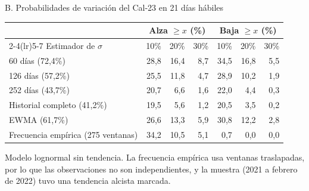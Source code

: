 \documentclass[aspectratio=169,11pt]{beamer}
\newcommand{\fuente}[1]{\vfill{\raggedright\tiny\color{cezgray}Fuente: #1\par}}
\begin{document}
\begin{frame}[t]{B. Probabilidades de variación del Cal-23 en 21 días hábiles}
  \centering
  \scriptsize
  \renewcommand{\arraystretch}{1.2}
  \begin{tabular}{@{}l rrr rrr@{}}
    \toprule
    & \multicolumn{3}{c}{Alza $\geq x$ (\%)} & \multicolumn{3}{c}{Baja $\geq x$ (\%)}\\
    \cmidrule(lr){2-4}\cmidrule(lr){5-7}
    Estimador de $\sigma$ & 10\% & 20\% & 30\% & 10\% & 20\% & 30\%\\ \midrule
    60 días (72,4\%) & 28,8 & 16,4 & 8,7 & 34,5 & 16,8 & 5,5\\
    126 días (57,2\%) & 25,5 & 11,8 & 4,7 & 28,9 & 10,2 & 1,9\\
    252 días (43,7\%) & 20,7 & 6,6 & 1,6 & 22,0 & 4,4 & 0,3\\
    Historial completo (41,2\%) & 19,5 & 5,6 & 1,2 & 20,5 & 3,5 & 0,2\\
    EWMA (61,7\%) & 26,6 & 13,3 & 5,9 & 30,8 & 12,2 & 2,8\\ \midrule
    Frecuencia empírica (275 ventanas) & 34,2 & 10,5 & 5,1 & 0,7 & 0,0 & 0,0\\
    \bottomrule
  \end{tabular}
  \vspace{3mm}

  \begin{minipage}{0.95\textwidth}\raggedright\scriptsize
  Modelo lognormal sin tendencia. La frecuencia empírica usa ventanas traslapadas, por lo que las observaciones no son independientes, y la muestra (2021 a febrero de 2022) tuvo una tendencia alcista marcada.
  \end{minipage}
\end{frame}
\end{document}
